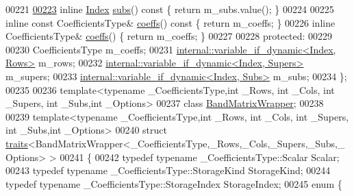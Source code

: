 \begin{DoxyCode}
00221 
\hyperlink{group___core___module_a8e685c7075a432979d72822db86e6d0e}{00223}     \textcolor{keyword}{inline} \hyperlink{group___core___module_a554f30542cc2316add4b1ea0a492ff02}{Index} \hyperlink{group___core___module_a8e685c7075a432979d72822db86e6d0e}{subs}()\textcolor{keyword}{ const }\{ \textcolor{keywordflow}{return} m\_subs.value(); \}
00224 
00225     \textcolor{keyword}{inline} \textcolor{keyword}{const} CoefficientsType& \hyperlink{class_eigen_1_1internal_1_1_band_matrix_base_ab7c9e9a7ca5ad0f2f3a82ac582650499}{coeffs}()\textcolor{keyword}{ const }\{ \textcolor{keywordflow}{return} m\_coeffs; \}
00226     \textcolor{keyword}{inline} CoefficientsType& \hyperlink{class_eigen_1_1internal_1_1_band_matrix_base_ab7c9e9a7ca5ad0f2f3a82ac582650499}{coeffs}() \{ \textcolor{keywordflow}{return} m\_coeffs; \}
00227 
00228   \textcolor{keyword}{protected}:
00229 
00230     CoefficientsType m\_coeffs;
00231     \hyperlink{class_eigen_1_1internal_1_1variable__if__dynamic}{internal::variable\_if\_dynamic<Index, Rows>}   m\_rows;
00232     \hyperlink{class_eigen_1_1internal_1_1variable__if__dynamic}{internal::variable\_if\_dynamic<Index, Supers>} m\_supers;
00233     \hyperlink{class_eigen_1_1internal_1_1variable__if__dynamic}{internal::variable\_if\_dynamic<Index, Subs>}   m\_subs;
00234 \};
00235 
00236 \textcolor{keyword}{template}<\textcolor{keyword}{typename} \_CoefficientsType,\textcolor{keywordtype}{int} \_Rows, \textcolor{keywordtype}{int} \_Cols, \textcolor{keywordtype}{int} \_Supers, \textcolor{keywordtype}{int} \_Subs,\textcolor{keywordtype}{int} \_Options>
00237 \textcolor{keyword}{class }\hyperlink{class_eigen_1_1internal_1_1_band_matrix_wrapper}{BandMatrixWrapper};
00238 
00239 \textcolor{keyword}{template}<\textcolor{keyword}{typename} \_CoefficientsType,\textcolor{keywordtype}{int} \_Rows, \textcolor{keywordtype}{int} \_Cols, \textcolor{keywordtype}{int} \_Supers, \textcolor{keywordtype}{int} \_Subs,\textcolor{keywordtype}{int} \_Options>
00240 \textcolor{keyword}{struct }\hyperlink{struct_eigen_1_1internal_1_1traits}{traits}<BandMatrixWrapper<\_CoefficientsType,\_Rows,\_Cols,\_Supers,\_Subs,\_Options> >
00241 \{
00242   \textcolor{keyword}{typedef} \textcolor{keyword}{typename} \_CoefficientsType::Scalar Scalar;
00243   \textcolor{keyword}{typedef} \textcolor{keyword}{typename} \_CoefficientsType::StorageKind StorageKind;
00244   \textcolor{keyword}{typedef} \textcolor{keyword}{typename} \_CoefficientsType::StorageIndex StorageIndex;
00245   \textcolor{keyword}{enum} \{

\end{DoxyCode}
